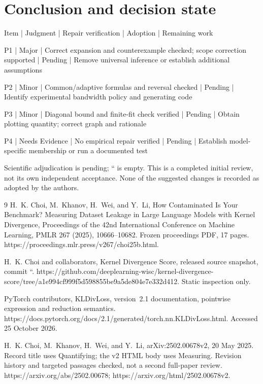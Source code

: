\documentclass[10pt]{article}
\begin{document}
\section*{Conclusion and decision state}
Item | Judgment | Repair verification | Adoption | Remaining work\par
P1 | Major | Correct expansion and counterexample checked; scope correction supported | Pending | Remove universal inference or establish additional assumptions\par
P2 | Minor | Common/adaptive formulas and reversal checked | Pending | Identify experimental bandwidth policy and generating code\par
P3 | Minor | Diagonal bound and finite-fit check verified | Pending | Obtain plotting quantity; correct graph and rationale\par
P4 | Needs Evidence | No empirical repair verified | Pending | Establish model-specific membership or run a documented test\par
Scientific adjudication is pending; `` is empty. This is a completed initial review, not its own independent acceptance. None of the suggested changes is recorded as adopted by the authors.\par
9 H. K. Choi, M. Khanov, H. Wei, and Y. Li, How Contaminated Is Your Benchmark? Measuring Dataset Leakage in Large Language Models with Kernel Divergence, Proceedings of the 42nd International Conference on Machine Learning, PMLR 267 (2025), 10666–10682. Frozen proceedings PDF, 17 pages. https://proceedings.mlr.press/v267/choi25b.html.\par
H. K. Choi and collaborators, Kernel Divergence Score, released source snapshot, commit ``. https://github.com/deeplearning-wisc/kernel-divergence-score/tree/a1e994cf999f5d598855be9a5de804e7e332d412. Static inspection only.\par
PyTorch contributors, KLDivLoss, version 2.1 documentation, pointwise expression and reduction semantics. https://docs.pytorch.org/docs/2.1/generated/torch.nn.KLDivLoss.html. Accessed 25 October 2026.\par
H. K. Choi, M. Khanov, H. Wei, and Y. Li, arXiv:2502.00678v2, 20 May 2025. Record title uses Quantifying; the v2 HTML body uses Measuring. Revision history and targeted passages checked, not a second full-paper review. https://arxiv.org/abs/2502.00678; https://arxiv.org/html/2502.00678v2.\par
\end{document}
